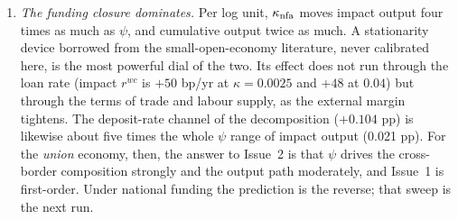 \begin{enumerate}
rises ($-0.34$ to $-0.56$ pp at q4), the opposite of what a stiffer rebalancing friction should
do, because the friction holds the level while the debt stock grows. At $\psi=1$ the F share
rises on impact (F banks buy at the dip) before falling.
\item \emph{The funding closure dominates.} Per log unit, $\kappa_{\rm nfa}$ moves impact output
four times as much as $\psi$, and cumulative output twice as much. A stationarity device borrowed
from the small-open-economy literature, never calibrated here, is the most powerful dial of the
two. Its effect does not run through the loan rate (impact $r^{wc}$ is $+50$ bp/yr at
$\kappa=0.0025$ and $+48$ at $0.04$) but through the terms of trade and labour supply, as the
external margin tightens. The deposit-rate channel of the decomposition ($+0.104$ pp) is likewise
about five times the whole $\psi$ range of impact output (0.021 pp). For the \emph{union}
economy, then, the answer to Issue~2 is that $\psi$ drives the cross-border composition strongly
and the output path moderately, and Issue~1 is first-order. Under national funding the
prediction is the reverse; that sweep is the next run.
\end{enumerate}
